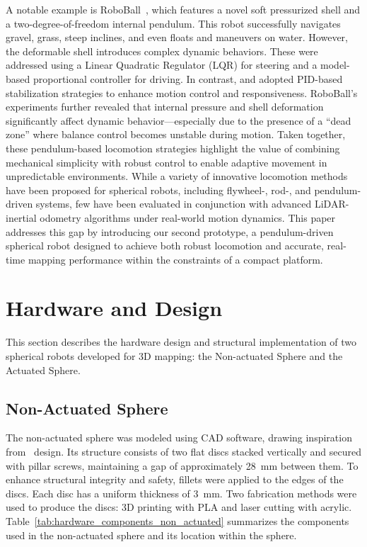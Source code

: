 \documentclass[conference]{IEEEtran}
\begin{document}
A notable example is RoboBall~\cite{roboball}, which features a novel soft pressurized shell and a two-degree-of-freedom internal pendulum. 
This robot successfully navigates gravel, grass, steep inclines, and even floats and maneuvers on water. 
However, the deformable shell introduces complex dynamic behaviors. 
These were addressed using a Linear Quadratic Regulator (LQR) for steering and a model-based proportional controller for driving. 
In contrast, \cite{novelsphere} and \cite{pendulum_sphere} adopted PID-based stabilization strategies to enhance motion control and responsiveness. 
RoboBall’s experiments further revealed that internal pressure and shell deformation significantly affect dynamic behavior—especially due to the presence of a ``dead zone'' where balance control becomes unstable during motion.
Taken together, these pendulum-based locomotion strategies highlight the value of combining mechanical simplicity with robust control to enable adaptive movement in unpredictable environments. 
While a variety of innovative locomotion methods have been proposed for spherical robots, including flywheel-, rod-, and pendulum-driven systems, few have been evaluated in conjunction with advanced LiDAR-inertial odometry algorithms under real-world motion dynamics.
This paper addresses this gap by introducing our second prototype, a pendulum-driven spherical robot designed to achieve both robust locomotion and accurate, real-time mapping performance within the constraints of a compact platform.

\section{Hardware and Design}
\label{sec:hardwaredesing}

This section describes the hardware design and structural implementation of two spherical robots developed for 3D mapping: the Non-actuated Sphere and the Actuated Sphere.
 \subsection{Non-Actuated Sphere}

The non-actuated sphere was modeled using CAD software, drawing inspiration from~\cite{Kalman_filter_sphere} design. 
Its structure consists of two flat discs stacked vertically and secured with pillar screws, maintaining a gap of approximately \SI{28}{\milli\meter} between them. 
To enhance structural integrity and safety, fillets were applied to the edges of the discs. 
Each disc has a uniform thickness of \SI{3}{\milli\meter}.
Two fabrication methods were used to produce the discs: 3D printing with PLA and laser cutting with acrylic. 
Table~\ref{tab:hardware_components_non_actuated} summarizes the components used in the non-actuated sphere and its location within the sphere.
\end{document}
